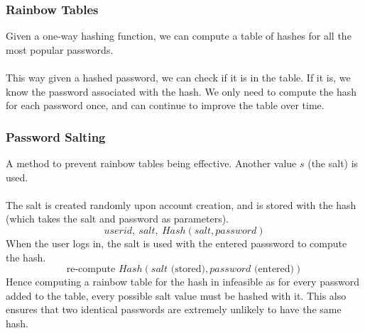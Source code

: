 \documentclass{report}
\begin{document}
\subsubsection*{Rainbow Tables}{
Given a one-way hashing function, we can compute a table of hashes for all the most popular passwords.
\\
\\ This way given a hashed password, we can check if it is in the table. If it is, we know the password associated with the hash. We only need to compute the hash for each password once, and can continue to improve the table over time.

\subsubsection*{Password Salting}{
A method to prevent rainbow tables being effective. Another value $s$ (the salt) is used.
\\
\\ The salt is created randomly upon account creation, and is stored with the hash (which takes the salt and password as parameters).
\[userid, \ salt, \ Hash(salt, password)\]
When the user logs in, the salt is used with the entered passsword to compute the hash.
\[\text{re-compute } Hash(salt \text{ (stored)}, password \text{ (entered)})\]
Hence computing a rainbow table for the hash in infeasible as for every password added to the table, every possible salt value must be hashed with it. This also ensures that two identical passwords are extremely unlikely to have the same hash.
}}
\end{document}
